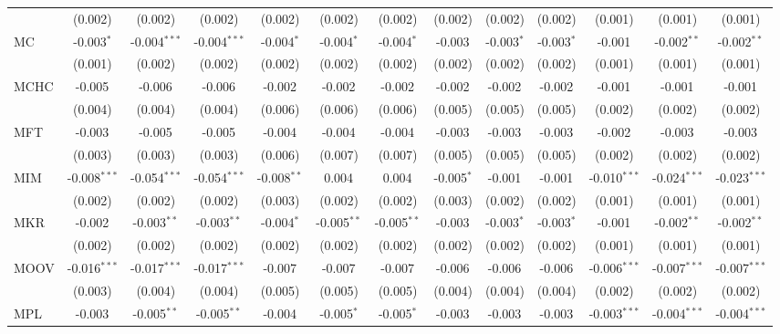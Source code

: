 \begin{table}[!htbp]
\begin{tabular}{@{\extracolsep{5pt}}lcccccccccccc}
  & (0.002) & (0.002) & (0.002) & (0.002) & (0.002) & (0.002) & (0.002) & (0.002) & (0.002) & (0.001) & (0.001) & (0.001) \\
 MC & -0.003$^{*}$ & -0.004$^{***}$ & -0.004$^{***}$ & -0.004$^{*}$ & -0.004$^{*}$ & -0.004$^{*}$ & -0.003$^{}$ & -0.003$^{*}$ & -0.003$^{*}$ & -0.001$^{}$ & -0.002$^{**}$ & -0.002$^{**}$ \\
  & (0.001) & (0.002) & (0.002) & (0.002) & (0.002) & (0.002) & (0.002) & (0.002) & (0.002) & (0.001) & (0.001) & (0.001) \\
 MCHC & -0.005$^{}$ & -0.006$^{}$ & -0.006$^{}$ & -0.002$^{}$ & -0.002$^{}$ & -0.002$^{}$ & -0.002$^{}$ & -0.002$^{}$ & -0.002$^{}$ & -0.001$^{}$ & -0.001$^{}$ & -0.001$^{}$ \\
  & (0.004) & (0.004) & (0.004) & (0.006) & (0.006) & (0.006) & (0.005) & (0.005) & (0.005) & (0.002) & (0.002) & (0.002) \\
 MFT & -0.003$^{}$ & -0.005$^{}$ & -0.005$^{}$ & -0.004$^{}$ & -0.004$^{}$ & -0.004$^{}$ & -0.003$^{}$ & -0.003$^{}$ & -0.003$^{}$ & -0.002$^{}$ & -0.003$^{}$ & -0.003$^{}$ \\
  & (0.003) & (0.003) & (0.003) & (0.006) & (0.007) & (0.007) & (0.005) & (0.005) & (0.005) & (0.002) & (0.002) & (0.002) \\
 MIM & -0.008$^{***}$ & -0.054$^{***}$ & -0.054$^{***}$ & -0.008$^{**}$ & 0.004$^{}$ & 0.004$^{}$ & -0.005$^{*}$ & -0.001$^{}$ & -0.001$^{}$ & -0.010$^{***}$ & -0.024$^{***}$ & -0.023$^{***}$ \\
  & (0.002) & (0.002) & (0.002) & (0.003) & (0.002) & (0.002) & (0.003) & (0.002) & (0.002) & (0.001) & (0.001) & (0.001) \\
 MKR & -0.002$^{}$ & -0.003$^{**}$ & -0.003$^{**}$ & -0.004$^{*}$ & -0.005$^{**}$ & -0.005$^{**}$ & -0.003$^{}$ & -0.003$^{*}$ & -0.003$^{*}$ & -0.001$^{}$ & -0.002$^{**}$ & -0.002$^{**}$ \\
  & (0.002) & (0.002) & (0.002) & (0.002) & (0.002) & (0.002) & (0.002) & (0.002) & (0.002) & (0.001) & (0.001) & (0.001) \\
 MOOV & -0.016$^{***}$ & -0.017$^{***}$ & -0.017$^{***}$ & -0.007$^{}$ & -0.007$^{}$ & -0.007$^{}$ & -0.006$^{}$ & -0.006$^{}$ & -0.006$^{}$ & -0.006$^{***}$ & -0.007$^{***}$ & -0.007$^{***}$ \\
  & (0.003) & (0.004) & (0.004) & (0.005) & (0.005) & (0.005) & (0.004) & (0.004) & (0.004) & (0.002) & (0.002) & (0.002) \\
 MPL & -0.003$^{}$ & -0.005$^{**}$ & -0.005$^{**}$ & -0.004$^{}$ & -0.005$^{*}$ & -0.005$^{*}$ & -0.003$^{}$ & -0.003$^{}$ & -0.003$^{}$ & -0.003$^{***}$ & -0.004$^{***}$ & -0.004$^{***}$ \\

\end{tabular}
\end{table}
